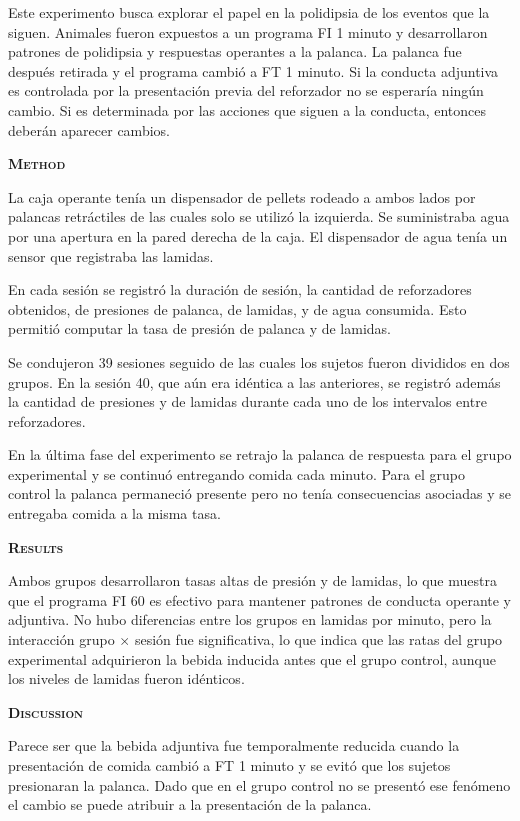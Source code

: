 \documentclass[a4paper,12pt]{article}
\begin{document}
Este experimento busca explorar el papel en la polidipsia de los eventos que la siguen. Animales fueron expuestos a un programa FI 1 minuto y desarrollaron patrones de polidipsia y respuestas operantes a la palanca. La palanca fue después retirada y el programa cambió a FT 1 minuto. Si la conducta adjuntiva es controlada por la presentación previa del reforzador no se esperaría ningún cambio. Si es determinada por las acciones que siguen a la conducta, entonces deberán aparecer cambios. 

{\scshape\bfseries Method}

La caja operante tenía un dispensador de pellets rodeado a ambos lados por palancas retráctiles de las cuales solo se utilizó la izquierda. Se suministraba agua por una apertura en la pared derecha de la caja. El dispensador de agua tenía un sensor que registraba las lamidas.

En cada sesión se registró la duración de sesión, la cantidad de reforzadores obtenidos, de presiones de palanca, de lamidas, y de agua consumida. Esto permitió computar la tasa de presión de palanca y de lamidas.

Se condujeron 39 sesiones seguido de las cuales los sujetos fueron divididos en dos grupos. En la sesión 40, que aún era idéntica a las anteriores, se registró además la cantidad de presiones y de lamidas durante cada uno de los intervalos entre reforzadores.

En la última fase del experimento se retrajo la palanca de respuesta para el grupo experimental y se continuó entregando comida cada minuto. Para el grupo control la palanca permaneció presente pero no tenía consecuencias asociadas y se entregaba comida a la misma tasa. 

{\scshape\bfseries Results}

Ambos grupos desarrollaron tasas altas de presión y de lamidas, lo que muestra que el programa FI 60 es efectivo para mantener patrones de conducta operante y adjuntiva. No hubo diferencias entre los grupos en lamidas por minuto, pero la interacción grupo $\times$ sesión fue significativa, lo que indica que las ratas del grupo experimental adquirieron la bebida inducida antes que el grupo control, aunque los niveles de lamidas fueron idénticos.

{\scshape\bfseries Discussion}

Parece ser que la bebida adjuntiva fue temporalmente reducida cuando la presentación de comida cambió a FT 1 minuto y se evitó que los sujetos presionaran la palanca. Dado que en el grupo control no se presentó ese fenómeno el cambio se puede atribuir a la presentación de la palanca.
\end{document}
